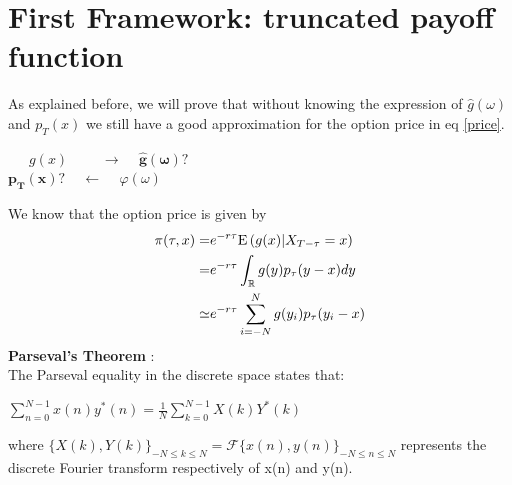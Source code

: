 \documentclass[12pt]{report}
\begin{document}
\newpage


\section{First Framework: truncated payoff function}

As explained before, we will prove that without knowing the expression of $\hat g (\omega)$ and $p_T(x)$ we still have a good approximation for the option price in eq \eqref{price}.

\begin{center}
 
~~~$g(x)$ ~~~~$\rightarrow$  ~  $ \mathbf{\hat g (\omega) ? }$\\
$\mathbf{{p_T}(x) ?}$ ~  $\leftarrow$ ~  $ \varphi (\omega)$
\end{center}

We know that the option price is given by 
\begin{align*}
\pi(\tau,x)= & e^{-r\tau} \mathrm{E} \left( {{g(x)|X_{T-\tau} = x}} \right)\\
\label{ff}
=& e^{-r\tau} \int_{\mathbb{R}}g(y)p_{\tau}(y-x)dy \\
\simeq  & e^{-r\tau} \sum_{i=-N}^{N}g(y_i)p_{\tau} (y_i-x)
\end{align*}
\textbf{Parseval's Theorem } : \\
The Parseval equality  in the discrete space states that: 
\begin{center}
\label{sum}
$\sum \limits_{n=0}^{N-1} x(n)y^*(n)= \frac{1}{N} \sum \limits_{k=0}^{N-1} X(k)Y^*(k)$
\end{center} 
where $\{X(k), Y(k)\}_{-N \leq k \leq N} = \mathcal{F} \{ x(n),y(n)\}_{-N \leq n \leq N} $ represents the discrete  Fourier transform respectively of x(n) and y(n).
\jcom{}\\
\end{document}
